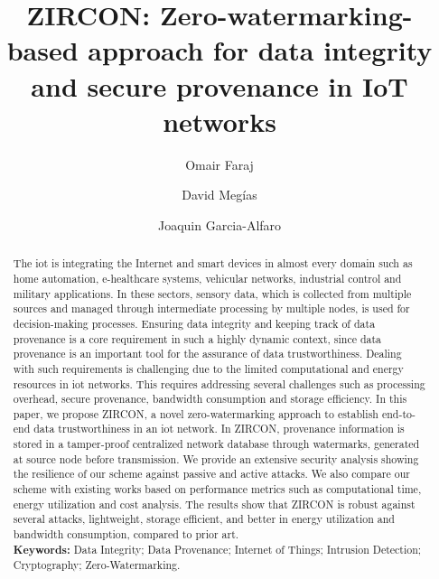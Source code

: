 \documentclass{llncs}
\begin{document}
\title{ZIRCON: Zero-watermarking-based approach for data integrity and secure provenance in IoT networks}


\author{Omair Faraj \and David Meg\'ias    \and Joaquin Garcia-Alfaro }


\maketitle


\begin{abstract}
The \gls*{iot} is integrating the Internet and smart devices in almost every domain such as home automation, e-healthcare systems, vehicular networks, industrial control and military applications. In these sectors, sensory data, which is collected from multiple sources and managed through intermediate processing by multiple nodes, is used for decision-making processes. Ensuring data integrity and keeping track of data provenance is a core requirement in such a highly dynamic context, since data provenance is an important tool for the assurance of data trustworthiness. Dealing with such requirements is challenging due to the limited computational and energy resources in \gls*{iot} networks. This requires addressing several challenges such as processing overhead, secure provenance, bandwidth consumption and storage efficiency. In this paper, we propose ZIRCON, a novel zero-watermarking approach to establish end-to-end data trustworthiness in an \gls*{iot} network. 
In ZIRCON, provenance information is stored in a tamper-proof centralized network database through watermarks, generated at source node before transmission. We provide an extensive security analysis showing the resilience of our scheme against passive and active attacks. We also compare our scheme with existing works based on performance metrics such as computational time, energy utilization and cost analysis. The results show that ZIRCON is robust against several attacks, lightweight, storage efficient, and better in energy utilization and bandwidth consumption, compared to prior art.\\

\textbf{Keywords:} Data Integrity; Data Provenance; Internet of Things; Intrusion Detection; Cryptography; Zero-Watermarking.
\end{abstract}
\end{document}
